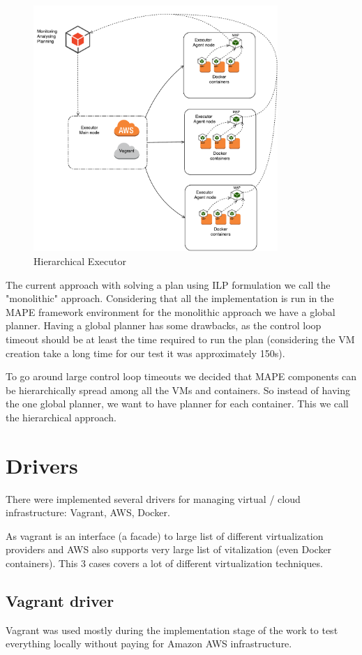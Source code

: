 \begin{figure}[ht]
  \centering
    \includegraphics[width=350px,natwidth=684,natheight=687]{./pictures/arch-hierachical}
    \caption{Hierarchical Executor}
\end{figure}

The current approach with solving a plan using ILP formulation we call the "monolithic" approach. Considering that all the implementation is run in the MAPE framework environment for the monolithic approach we have a global planner. Having a global planner has some drawbacks, as the control loop timeout should be at least the time required to run the plan (considering the VM creation take a long time for our test it was approximately 150s).

To go around large control loop timeouts we decided that MAPE components can be hierarchically spread among all the VMs and containers. So instead of having the one global planner, we want to have planner for each container. This we call the hierarchical approach.

\section{Drivers}
There were implemented several drivers for managing virtual / cloud infrastructure: Vagrant, AWS, Docker.

As vagrant is an interface (a facade) to large list of different virtualization providers and AWS also supports very large list of vitalization (even Docker containers). This 3 cases covers a lot of different virtualization techniques.

\subsection{Vagrant driver}
Vagrant was used mostly during the implementation stage of the work to test everything locally without paying for Amazon AWS infrastructure.

